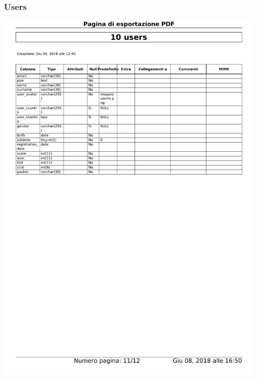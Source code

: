 \documentclass{article}
\begin{document}
    \subsubsection{Users}
    \begin{center}
        \includegraphics[width=15cm]{images/users}
    \end{center}
\end{document}
